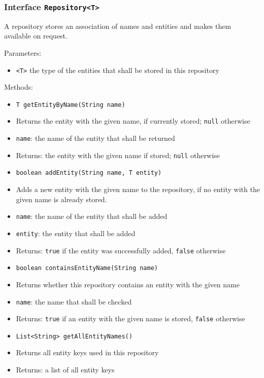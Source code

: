 \documentclass[parskip=full,11pt]{scrartcl}
\begin{document}
\subsubsection{Interface \texttt{Repository<T>}}

A repository stores an association of names and entities and makes them available on request.

Parameters:
\begin{itemize}\itemsep -10pt
	\item \texttt{<T>} the type of the entities that shall be stored in this repository
\end{itemize}


Methods:
\begin{itemize}\itemsep -10pt
	\item \texttt{T getEntityByName(String name)}
	\item[] Returns the entity with the given name, if currently stored; \texttt{null} otherwise
	\item[] \texttt{name}: the name of the entity that shall be returned
	\item[] Returns: the entity with the given name if stored; \texttt{null} otherwise

	\item \texttt{boolean addEntity(String name, T entity)}
	\item[] Adds a new entity with the given name to the repository, if no entity with the given name is already stored.
	\item[] \texttt{name}: the name of the entity that shall be added
	\item[] \texttt{entity}: the entity that shall be added
	\item[] Returns: \texttt{true} if the entity was successfully added, \texttt{false} otherwise

	\item \texttt{boolean containsEntityName(String name)}
	\item[] Returns whether this repository contains an entity with the given name
	\item[] \texttt{name}: the name that shall be checked
	\item[] Returns: \texttt{true} if an entity with the given name is stored, \texttt{false} otherwise

	\item \texttt{List<String> getAllEntityNames()}
	\item[] Returns all entity keys used in this repository
	\item[] Returns: a list of all entity keys

\end{itemize}
\end{document}
